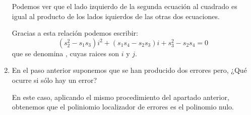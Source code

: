 \begin{example}
\begin{enumerate}
Podemos ver que el lado izquierdo de la segunda ecuación al cuadrado es igual al producto de los lados iquierdos de las otras dos ecuaciones.

Gracias a esta relación podemos escribir:
\[(s_2^2-s_1s_3)i^2+(s_1s_4-s_2s_3)i+s_3^2-s_2s_4=0\]
que se denomina , cuyas raices son $i$ y $j$.

\item En el paso anterior suponemos que se han producido dos errores pero, ¿Qué ocurre si sólo hay un error?

En este caso, aplicando el mismo procedimiento del apartado anterior, obtenemos que el poliniomio localizador de errores es el polinomio nulo.

\end{enumerate}
\end{example}
